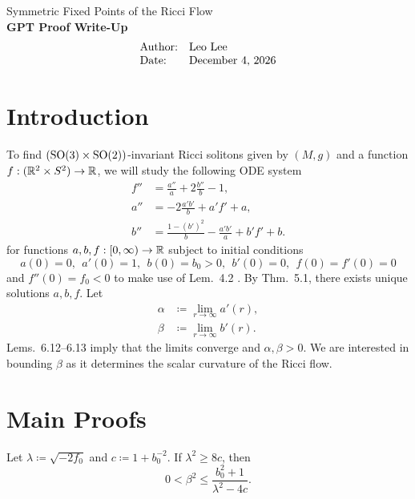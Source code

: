 \documentclass[11pt,letterpaper]{article}
\begin{document}
\begin{center}
    {\LARGE Symmetric Fixed Points of the Ricci Flow} \\[6pt]
    {\large \textbf{GPT Proof Write-Up}}
    \[
    \begin{array}{ll}
    \text{Author:}  &\text{Leo Lee} \\
    \text{Date:} &\text{\today} \\
    \end{array}
    \]
\end{center}

\vspace{-6pt}

\section{Introduction}
To find $(\operatorname{SO}(3) \times \operatorname{SO}(2))$-invariant Ricci solitons given by $(M, g)$ and a function $f: (\mathbb{R}^2 \times S^2) \to \mathbb{R}$, we will study the following ODE system \cite[Eqs.~(2.1)--(2.3)]{Rajan}
\begin{align}
    f'' &= \frac{a''}{a} + 2 \frac{b''}{b} - 1, \label{eq:rajan21} \\
    a'' &= -2 \frac{a'b'}{b} + a'f' + a, \label{eq:rajan22} \\
    b'' &= \frac{1 - (b')^2}{b} - \frac{a'b'}{a} + b'f' + b. \label{eq:rajan23}
\end{align}
for functions $a,b,f: [0, \infty) \to \mathbb{R}$ subject to initial conditions \cite[Lem.~2.1]{Rajan}
\[
    a(0) = 0,\ \ a'(0) = 1,\ \ b(0) = b_0 > 0,\ \ b'(0) = 0,\ \ f(0) = f'(0) = 0
\]
and $f''(0) = f_0 < 0$ to make use of Lem.~4.2 \cite{Rajan}. By Thm.~5.1, there exists unique solutions $a,b,f$. Let
\begin{align*}
    \alpha &\coloneq \lim_{r \to \infty} a'(r), \\
    \beta &\coloneq \lim_{r \to \infty} b'(r).
\end{align*}
Lems.~6.12--6.13 imply that the limits converge and $\alpha, \beta > 0$. We are interested in bounding $\beta$ as it determines the scalar curvature of the Ricci flow.

\section{Main Proofs}

\begin{theorem} \label{thm:main-ricci}
    Let $\lambda \coloneq \sqrt{-2f_0}$ and $c \coloneq 1 + b_0^{-2}$. If $\lambda^2 \ge 8c$, then
    \begin{equation}
        0 < \beta^2 \le \frac{b_0^2 + 1}{\lambda^2 - 4c}.
    \end{equation}
\end{theorem}
\end{document}
